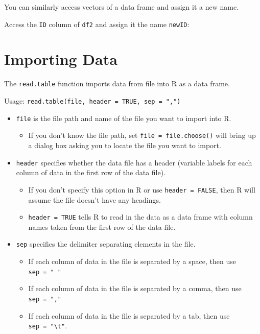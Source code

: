 \documentclass[
]{article}
\newenvironment{Shaded}{\begin{snugshade}}{\end{snugshade}}
\newcommand{\NormalTok}[1]{#1}
\newcommand{\OtherTok}[1]{\textcolor[rgb]{0.56,0.35,0.01}{#1}}
\newcommand{\SpecialCharTok}[1]{\textcolor[rgb]{0.00,0.00,0.00}{#1}}
\providecommand{\tightlist}{%
  \setlength{\itemsep}{0pt}\setlength{\parskip}{0pt}}
\begin{document}
You can similarly access vectors of a data frame and assign it a new
name.

Access the \texttt{ID} column of \texttt{df2} and assign it the name
\texttt{newID}:

\begin{Shaded}
\end{Shaded}

\hypertarget{importing-data}{%
\section{Importing Data}\label{importing-data}}

The \texttt{read.table} function imports data from file into R as a data
frame.

Usage: \texttt{read.table(file,\ header\ =\ TRUE,\ sep\ =\ ",")}

\begin{itemize}
\tightlist
\item
  \texttt{file} is the file path and name of the file you want to import
  into R.

  \begin{itemize}
  \tightlist
  \item
    If you don't know the file path, set \texttt{file\ =\ file.choose()}
    will bring up a dialog box asking you to locate the file you want to
    import.
  \end{itemize}
\item
  \texttt{header} specifies whether the data file has a header (variable
  labels for each column of data in the first row of the data file).

  \begin{itemize}
  \tightlist
  \item
    If you don't specify this option in R or use
    \texttt{header\ =\ FALSE}, then R will assume the file doesn't have
    any headings.
  \item
    \texttt{header\ =\ TRUE} tells R to read in the data as a data frame
    with column names taken from the first row of the data file.
  \end{itemize}
\item
  \texttt{sep} specifies the delimiter separating elements in the file.

  \begin{itemize}
  \tightlist
  \item
    If each column of data in the file is separated by a space, then use
    \texttt{sep\ =\ "\ "}
  \item
    If each column of data in the file is separated by a comma, then use
    \texttt{sep\ =\ ","}
  \item
    If each column of data in the file is separated by a tab, then use
    \texttt{sep\ =\ "\textbackslash{}t"}.
  \end{itemize}
\end{itemize}
\end{document}
